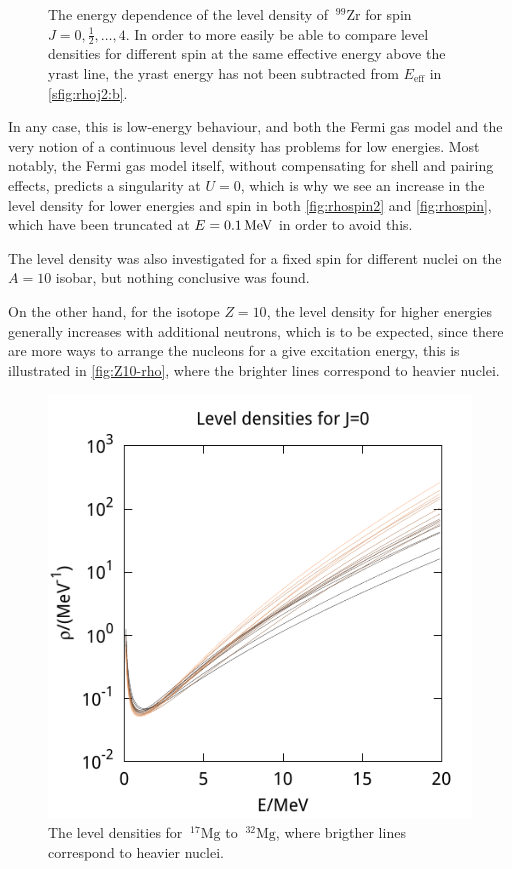 \begin{figure}
\begin{center}
\begin{tabular}{cc}
\end{tabular}
\caption{\label{fig:rhospin2} The energy dependence of the level density of $~^{99}\mathrm{Zr}$ for spin $J=0,\tfrac{1}{2},\dots, 4$. In order to more easily be able to compare level densities for different spin at the same effective energy above the yrast line, the yrast energy has not been subtracted from $E_\text{eff}$ in \ref{sfig:rhoj2:b}.}
\end{center}
\end{figure}

In any case, this is low-energy behaviour, and both the Fermi gas model\cite{grossjean1985} and the very notion of a continuous level density has problems for low energies. Most notably, the Fermi gas model itself, without compensating for shell and pairing effects, predicts a singularity at $U=0$, which is why we see an increase in the level density for lower energies and spin in both \autoref{fig:rhospin2} and \autoref{fig:rhospin}, which have been truncated at $E=\unit[0.1]{MeV}$ in order to avoid this.

The level density was also investigated for a fixed spin for different nuclei on the $A=10$ isobar, but nothing conclusive was found.

On the other hand, for the isotope $Z=10$, the level density for higher energies generally increases with additional neutrons, which is to be expected, since there are more ways to arrange the nucleons for a give excitation energy, this is illustrated in \autoref{fig:Z10-rho}, where the brighter lines correspond to heavier nuclei.

\begin{figure}
\begin{center}
\includegraphics[width=\textwidth]{figures/rho/Z10_N7-N22.pdf}
\caption{\label{fig:Z10-rho} The level densities for $~^{17}\mathrm{Mg}$ to $~^{32}\mathrm{Mg}$, where brigther lines correspond to heavier nuclei.}
\end{center}
\end{figure}

